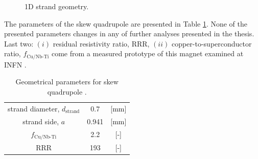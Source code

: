 \begin{figure}[H]
    \centering
    \caption{1D strand geometry.}
    \label{fig: 1d_strand_geometry}
\end{figure}

The parameters of the skew quadrupole are presented in Table \ref{table:skew_quad_params_table_basic}. None of the presented parameters changes in any of further analyses presented in the thesis. Last two: $(i)$ residual resistivity ratio, RRR, $(ii)$ copper-to-superconductor ratio, $f_\text{Cu/Nb-Ti}$ come from a measured prototype of this magnet examined at INFN \cite{marco_prioli_mails}.

\begin{table}[H]
    \caption{Geometrical parameters for skew quadrupole \cite{hl_lhc_tech_design_report_v01, marco_prioli_mails}.} 
    \vspace{-1.em} 
    \fontsize{10}{10}
    \selectfont 
    \renewcommand{\arraystretch}{1.5}
    \begin{center}
    \begin{tabular}{ ccc }  
    \hline
    strand diameter, $d_\text{strand}$ & 0.7 & [mm] \\
    strand side, $a$ & 0.941 & [mm] \\
    $f_\text{Cu/Nb-Ti}$ & 2.2 & [-] \\
    RRR & 193 & [-] \\  
    \hline 
    \end{tabular}
    \end{center}  
     \label{table:skew_quad_params_table_basic} 
 \end{table}
